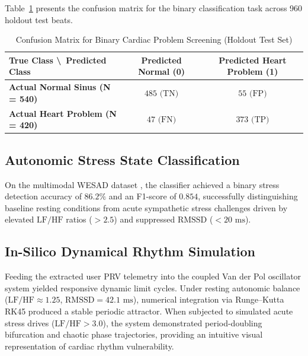 Table~\ref{tab:confusion_matrix} presents the confusion matrix for the binary classification task across 960 holdout test beats.

\begin{table}[!htbp]
\footnotesize
\centering
\caption{Confusion Matrix for Binary Cardiac Problem Screening (Holdout Test Set)}
\label{tab:confusion_matrix}
\begin{tabular}{|l|c|c|}
\hline
\textbf{True Class \textbackslash\ Predicted Class} & \textbf{Predicted Normal (0)} & \textbf{Predicted Heart Problem (1)} \\ \hline
\textbf{Actual Normal Sinus (N = 540)} & $485\text{ (TN)}$ & $55\text{ (FP)}$ \\ \hline
\textbf{Actual Heart Problem (N = 420)} & $47\text{ (FN)}$ & $373\text{ (TP)}$ \\ \hline
\end{tabular}
\end{table}

\subsection{Autonomic Stress State Classification}
On the multimodal WESAD dataset \cite{schmidt2018wesad}, the classifier achieved a binary stress detection accuracy of $86.2\%$ and an F1-score of $0.854$, successfully distinguishing baseline resting conditions from acute sympathetic stress challenges driven by elevated $\text{LF/HF}$ ratios ($>2.5$) and suppressed $\text{RMSSD}$ ($<20\text{ ms}$).

\subsection{In-Silico Dynamical Rhythm Simulation}
Feeding the extracted user PRV telemetry into the coupled Van der Pol oscillator system \cite{vanderpol1928, quiroz2018cardiac} yielded responsive dynamic limit cycles. Under resting autonomic balance ($\text{LF/HF} \approx 1.25$, $\text{RMSSD} = 42.1\text{ ms}$), numerical integration via Runge--Kutta RK45 \cite{dormand1980family} produced a stable periodic attractor. When subjected to simulated acute stress drives ($\text{LF/HF} > 3.0$), the system demonstrated period-doubling bifurcation and chaotic phase trajectories, providing an intuitive visual representation of cardiac rhythm vulnerability.

